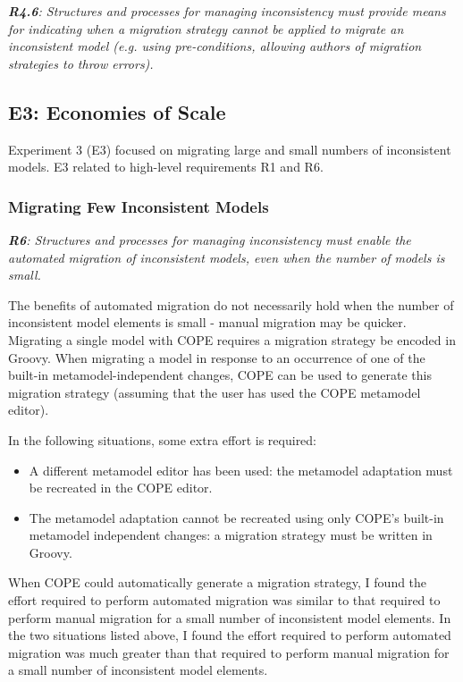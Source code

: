 \documentclass[a4paper]{article}
\begin{document}
\emph{\textbf{R4.6}: Structures and processes for managing inconsistency must provide means for indicating when a migration strategy cannot be applied to migrate an inconsistent model (e.g. using pre-conditions, allowing authors of migration strategies to throw errors).}



\subsection{E3: Economies of Scale}

Experiment 3 (E3) focused on migrating large and small numbers of inconsistent models. E3 related to high-level requirements R1 and R6.


\subsubsection{Migrating Few Inconsistent Models}

\emph{\textbf{R6}: Structures and processes for managing inconsistency must enable the automated migration of inconsistent models, even when the number of models is small.}

The benefits of automated migration do not necessarily hold when the number of inconsistent model elements is small - manual migration may be quicker. Migrating a single model with COPE requires a migration strategy be encoded in Groovy. When migrating a model in response to an occurrence of one of the built-in metamodel-independent changes, COPE can be used to generate this migration strategy (assuming that the user has used the COPE metamodel editor).

In the following situations, some extra effort is required:

\begin{itemize}
  \item A different metamodel editor has been used: the metamodel adaptation must be recreated in the COPE editor.
  \item The metamodel adaptation cannot be recreated using only COPE’s built-in metamodel independent changes: a migration strategy must be written in Groovy.
\end{itemize}

When COPE could automatically generate a migration strategy, I found the effort required to perform automated migration was similar to that required to perform manual migration for a small number of inconsistent model elements. In the two situations listed above, I found the effort required to perform automated migration was much greater than that required to perform manual migration for a small number of inconsistent model elements.
\end{document}
